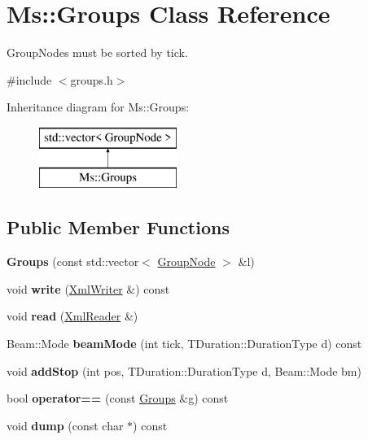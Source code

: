 \hypertarget{class_ms_1_1_groups}{}\section{Ms\+:\+:Groups Class Reference}
\label{class_ms_1_1_groups}


Group\+Nodes must be sorted by tick.  




{\ttfamily \#include $<$groups.\+h$>$}

Inheritance diagram for Ms\+:\+:Groups\+:\begin{figure}[H]
\begin{center}
\leavevmode
\includegraphics[height=2.000000cm]{class_ms_1_1_groups}
\end{center}
\end{figure}
\subsection*{Public Member Functions}
\begin{DoxyCompactItemize}
\item 
\mbox{\label{class_ms_1_1_groups_a2d44cdab028c7209b27ae07ab9a48840}} 
{\bfseries Groups} (const std\+::vector$<$ \hyperlink{struct_ms_1_1_group_node}{Group\+Node} $>$ \&l)
\item 
\mbox{\label{class_ms_1_1_groups_acbe5fcd72b434b707d135c9d0da3c0f7}} 
void {\bfseries write} (\hyperlink{class_ms_1_1_xml_writer}{Xml\+Writer} \&) const
\item 
\mbox{\label{class_ms_1_1_groups_a00a9d9585518db17f37301dd517b2c9b}} 
void {\bfseries read} (\hyperlink{class_ms_1_1_xml_reader}{Xml\+Reader} \&)
\item 
\mbox{\label{class_ms_1_1_groups_a5ebd3c669b891876ab3c2e375d4f5f0a}} 
Beam\+::\+Mode {\bfseries beam\+Mode} (int tick, T\+Duration\+::\+Duration\+Type d) const
\item 
\mbox{\label{class_ms_1_1_groups_a04f95079e7e391c409e9b0609d0f252b}} 
void {\bfseries add\+Stop} (int pos, T\+Duration\+::\+Duration\+Type d, Beam\+::\+Mode bm)
\item 
\mbox{\label{class_ms_1_1_groups_a10c825af2e37c62c2c31a5c6eab30286}} 
bool {\bfseries operator==} (const \hyperlink{class_ms_1_1_groups}{Groups} \&g) const
\item 
\mbox{\label{class_ms_1_1_groups_a325aead99baf185fc0bb67056246e184}} 
void {\bfseries dump} (const char $\ast$) const
\end{DoxyCompactItemize}
